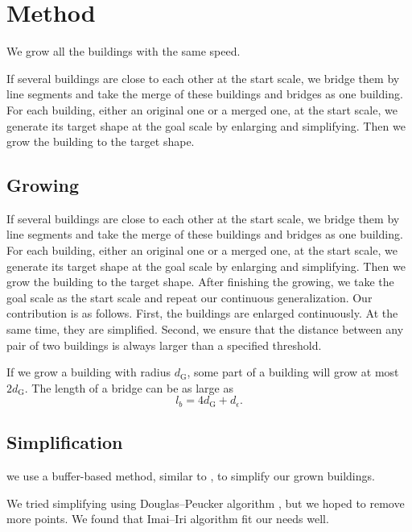 \documentclass[graybox]{svmult}
\begin{document}
\section{Method}

We grow all the buildings with the same speed.


If several buildings are close to each other at the start 
scale, we bridge them by line segments and take the merge of these 
buildings 
and bridges as one building.
For each building, either an original one or a merged one, at the start 
scale, 
we generate its target shape at 
the goal scale by enlarging and simplifying. Then we grow the  
building to the target shape. 

\subsection{Growing}
If several buildings are close to each other at the start 
scale, we bridge them by line segments and take the merge of these 
buildings 
and bridges as one building.
For each building, either an original one or a merged one, at the start 
scale, 
we generate its target shape at 
the goal scale by enlarging and simplifying. Then we grow the  
building to the target shape. 
%
After finishing the growing, we take the goal scale as the 
start scale and repeat our continuous generalization.
\newline\indent
Our contribution is as follows. First, the buildings 
are enlarged continuously. At the same time, they are simplified. 
Second, we ensure that the distance between any pair of two buildings is 
always larger than a specified threshold.

If we grow a building with radius $d_\mathrm{G}$, some part of a building will 
grow at most $2d_\mathrm{G}$.
The length of a bridge can be as large as
\begin{equation}
\label{eq:BridgeLength}
l_b=4d_\mathrm{G}+d_\epsilon.
\end{equation}

\subsection{Simplification}
we use a buffer-based method, similar to \textcite{Damen2008,Meijers2016}, to 
simplify our grown buildings.

We tried simplifying using Douglas--Peucker algorithm \parencite{Douglas1973}, 
but we hoped to remove more points. We found that Imai--Iri 
algorithm \parencite{ImaiIri1988} fit our needs well.
\end{document}
